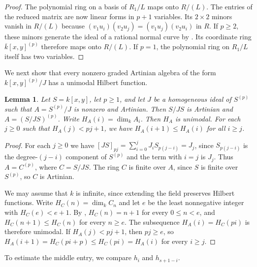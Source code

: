 \documentclass[a4paper,11pt]{amsart}
\newcommand{\kk}{k}
\newtheorem{lemma}[theorem]{Lemma}
\theoremstyle{definition}
\begin{document}
\begin{proof}
The polynomial ring on a basis of $R_1/L$ maps onto $R/(L)$. The entries of the reduced matrix are now linear forms in $p+1$ variables. Its $2\times2$ minors vanish in $R/(L)$ because $(v_1u_i)(v_2u_j)=(v_1u_j)(v_2u_i)$ in $R$. If $p\geq2$, these minors generate the ideal of a rational normal curve by \cite[Corollary~6.9~(b)]{E05}. Its coordinate ring $\overline{\kk}[x,y]^{(p)}$ therefore maps onto $R/(L)$. If $p=1$, the polynomial ring on $R_1/L$ itself has two variables.
\end{proof}

We next show that every nonzero graded Artinian algebra of the form $\kk[x,y]^{(p)}/J$ has a unimodal Hilbert function.

\begin{lemma}\label{lem:binary-veronese}
Let $S=\kk[x,y]$, let $p\geq1$, and let $J$ be a homogeneous ideal of $S^{(p)}$ such that $A=S^{(p)}/J$ is nonzero and Artinian. Then $S/JS$ is Artinian and $A=(S/JS)^{(p)}$. Write $H_A(i)=\dim_{\kk}A_i$. Then $H_A$ is unimodal. For each $j\geq0$ such that $H_A(j)<pj+1$, we have $H_A(i+1)\leq H_A(i)$ for all $i\geq j$.
\end{lemma}
\begin{proof}
For each $j\geq0$ we have $[JS]_{pj}=\sum_{i=0}^j J_i S_{p(j-i)}=J_j$, since $S_{p(j-i)}$ is the degree-$(j-i)$ component of $S^{(p)}$ and the term with $i=j$ is $J_j$. Thus $A=C^{(p)}$, where $C=S/JS$. The ring $C$ is finite over $A$, since $S$ is finite over $S^{(p)}$, so $C$ is Artinian.

We may assume that $\kk$ is infinite, since extending the field preserves Hilbert functions. Write $H_C(n)=\dim_{\kk}C_n$ and let $e$ be the least nonnegative integer with $H_C(e)<e+1$. By \cite[Lemma~2.3]{I05}, $H_C(n)=n+1$ for every $0\leq n<e$, and $H_C(n+1)\leq H_C(n)$ for every $n\geq e$. The subsequence $H_A(i)=H_C(pi)$ is therefore unimodal. If $H_A(j)<pj+1$, then $pj\geq e$, so $H_A(i+1)=H_C(pi+p)\leq H_C(pi)=H_A(i)$ for every $i\geq j$.
\end{proof}

To estimate the middle entry, we compare $h_i$ and $h_{s+1-i}$.
\end{document}
